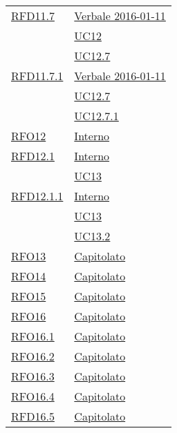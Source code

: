 \begin{longtable}{|>{\centering}m{5cm}|m{5cm}<{\centering}|}
\hyperlink{RFD11.7}{RFD11.7} & \hyperlink{Verbale 2016-01-11}{Verbale 2016-01-11}\\
& \hyperref[UC12]{UC12}\\
& \hyperref[UC12.7]{UC12.7}\\ \hline

\hyperlink{RFD11.7.1}{RFD11.7.1} & \hyperlink{Verbale 2016-01-11}{Verbale 2016-01-11}\\
& \hyperref[UC12.7]{UC12.7}\\
& \hyperref[UC12.7.1]{UC12.7.1}\\ \hline

\hyperlink{RFO12}{RFO12} & \hyperlink{Interno}{Interno}\\ \hline

\hyperlink{RFD12.1}{RFD12.1} & \hyperlink{Interno}{Interno}\\
& \hyperref[UC13]{UC13}\\ \hline

\hyperlink{RFD12.1.1}{RFD12.1.1} & \hyperlink{Interno}{Interno}\\
& \hyperref[UC13]{UC13}\\
& \hyperref[UC13.2]{UC13.2}\\ \hline

\hyperlink{RFO13}{RFO13} & \hyperlink{Capitolato}{Capitolato}\\ \hline

\hyperlink{RFO14}{RFO14} & \hyperlink{Capitolato}{Capitolato}\\ \hline

\hyperlink{RFO15}{RFO15} & \hyperlink{Capitolato}{Capitolato}\\ \hline

\hyperlink{RFO16}{RFO16} & \hyperlink{Capitolato}{Capitolato}\\ \hline

\hyperlink{RFO16.1}{RFO16.1} & \hyperlink{Capitolato}{Capitolato}\\ \hline

\hyperlink{RFO16.2}{RFO16.2} & \hyperlink{Capitolato}{Capitolato}\\ \hline

\hyperlink{RFO16.3}{RFO16.3} & \hyperlink{Capitolato}{Capitolato}\\ \hline

\hyperlink{RFO16.4}{RFO16.4} & \hyperlink{Capitolato}{Capitolato}\\ \hline

\hyperlink{RFD16.5}{RFD16.5} & \hyperlink{Capitolato}{Capitolato}\\ \hline


\end{longtable}

